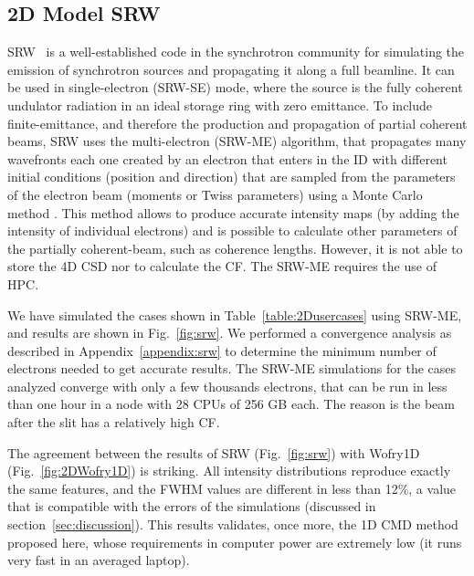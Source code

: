 \documentclass{iucr}              %
\begin{document}
\subsection{2D Model SRW}
SRW~\cite{codeSRW} is a well-established code in the synchrotron community for simulating the emission of synchrotron sources and propagating it along a full beamline. It can be used in single-electron (SRW-SE) mode, where the source is the fully coherent undulator radiation in an ideal storage ring with zero emittance. To include finite-emittance, and therefore the production and propagation of partial coherent beams, SRW uses the multi-electron (SRW-ME) algorithm, that propagates many wavefronts each one created by an electron that enters in the ID with different initial conditions (position and direction) that are sampled from the parameters of the electron beam (moments or Twiss parameters) using a Monte Carlo method \cite{codeSRW_ME}. This method allows to produce accurate intensity maps (by adding the intensity of individual electrons) and is possible to calculate other parameters of the partially coherent-beam, such as coherence lengths. However, it is not able to store the 4D CSD nor to calculate the CF. The SRW-ME requires the use of HPC. 

We have simulated the cases shown in Table~\ref{table:2Dusercases} using SRW-ME, and results are shown in Fig.~\ref{fig:srw}. We performed a convergence analysis as described in Appendix~\ref{appendix:srw} to determine the minimum number of electrons needed to get accurate results. The SRW-ME simulations for the cases analyzed converge with only a few thousands electrons, that can be run in less than one hour in a node with 28 CPUs of 256 GB each. The reason is the beam after the slit has a relatively high CF. 

The agreement between the results of SRW (Fig.~\ref{fig:srw}) with Wofry1D (Fig.~\ref{fig:2DWofry1D}) is striking. All intensity distributions reproduce exactly the same features, and the FWHM values are different in less than 12\%, a value that is compatible with the errors of the simulations (discussed in section~\ref{sec:discussion}). This results validates, once more, the 1D CMD method proposed here, whose requirements in computer power are extremely low (it runs very fast in an averaged laptop).  
\end{document}
